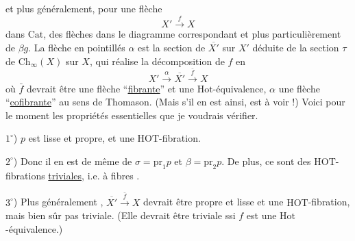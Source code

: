 et plus généralement, pour une flèche 
\[
X'\xrightarrow{f}X
\]
dans $\mathrm{Cat}$,  des flèches dans le diagramme
correspondant
et plus particulièrement de $\beta g$. La flèche
en pointillés $\alpha$ est la section de $\overline{X'}$ sur $X'$
déduite de la section $\tau$ de $\mathrm{Ch}_{\infty}(X)$ sur $X$,
qui réalise la décomposition de $f$ en
\[
X'\xrightarrow{\alpha}\overline{X'}\xrightarrow{\bar f}X
\]
où $\bar f$ devrait être une flèche ``\uline{fibrante}'' et
une $\mathrm{Hot}$-équivalence, $\alpha$ une flèche ``\uline{cofibrante}''
au sens de Thomason. (Mais s'il en est ainsi,
est à voir !) Voici pour le moment les
propriétés essentielles que je voudrais vérifier.

$1^\circ$) $p$ est lisse et propre, et  une $\mathrm{HOT}$-fibration. 

$2^\circ$) Donc il en est de même de $\sigma=\mathrm{pr}_1p$ et $\beta=\mathrm{pr}_2p$.
De plus, ce sont des $\mathrm{HOT}$-fibrations \uline{triviales}, i.e.
à fibres  .

$3^\circ$) Plus généralement , $\overline{X'}\xrightarrow{\bar f}X$ devrait  être
propre et lisse et une $\mathrm{HOT}$-fibration, mais bien
sûr   pas triviale. (Elle devrait être triviale ssi
$f$ est une $\mathrm{Hot}$-équivalence.)

